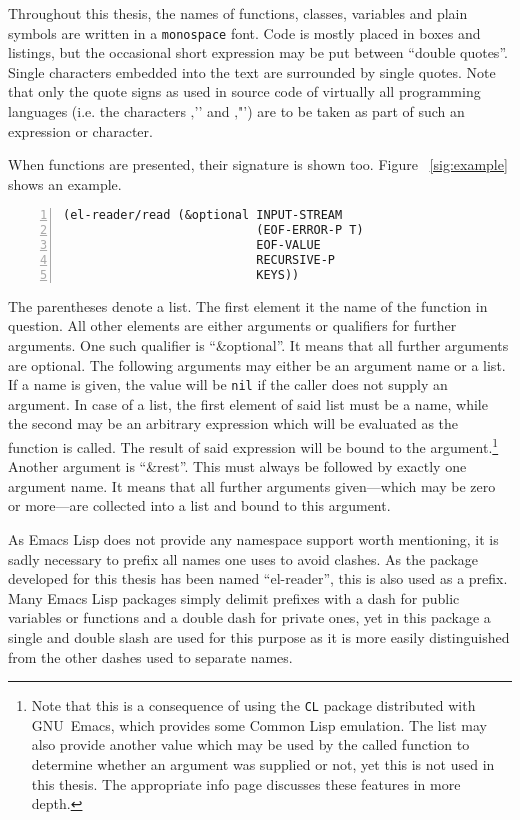 \documentclass[a4paper,10pt,twoside]{report}
\newcommand{\el}{Emacs Lisp}
\newcommand{\cl}{Common Lisp}
\newcommand{\sym}[1]{\texttt{#1}}
\newcommand{\emacs}{GNU~Emacs}
\newcommand{\nil}{\sym{nil}}
\begin{document}
Throughout this thesis, the names of functions, classes, variables and plain
symbols are written in a \texttt{monospace} font.  Code is mostly placed in
boxes and listings, but the occasional short expression may be put between
``double quotes''.  Single characters embedded into the text are surrounded by
single quotes.  Note that only the quote signs as used in source code of
virtually all programming languages (i.e. the characters ‚'’ and ‚"’) are to be
taken as part of such an expression or character.

When functions are presented, their signature is shown too.  Figure
~\ref{sig:example} shows an example.

\begin{lstlisting}[style=lispcode,label={sig:example},caption={Example function
signature},numbers=left]
(el-reader/read (&optional INPUT-STREAM
                           (EOF-ERROR-P T)
                           EOF-VALUE
                           RECURSIVE-P
                           KEYS))
\end{lstlisting}

The parentheses denote a list.  The first element it the name of the function in
question.  All other elements are either arguments or qualifiers for further
arguments.  One such qualifier is ``\&optional''.  It means that all further
arguments are optional.  The following arguments may either be an argument name
or a list.  If a name is given, the value will be \nil{} if the caller does not
supply an argument.  In case of a list, the first element of said list must be a
name, while the second may be an arbitrary expression which will be evaluated as
the function is called.  The result of said expression will be bound to the
argument.\footnote{Note that this is a consequence of using the \texttt{CL}
  package distributed with \emacs{}, which provides some \cl{} emulation.  The
  list may also provide another value which may be used by the called function
  to determine whether an argument was supplied or not, yet this is not used in
  this thesis.  The appropriate info page discusses these features in more
  depth.}  Another argument is ``\&rest''.  This must always be followed by
exactly one argument name.  It means that all further arguments given---which
may be zero or more---are collected into a list and bound to this argument.

As \el{} does not provide any namespace support worth mentioning, it is sadly
necessary to prefix all names one uses to avoid clashes.  As the package
developed for this thesis has been named ``el-reader'', this is also used as a
prefix.  Many \el{} packages simply delimit prefixes with a dash for public
variables or functions and a double dash for private ones, yet in this package a
single and double slash are used for this purpose as it is more easily
distinguished from the other dashes used to separate names.
\end{document}
